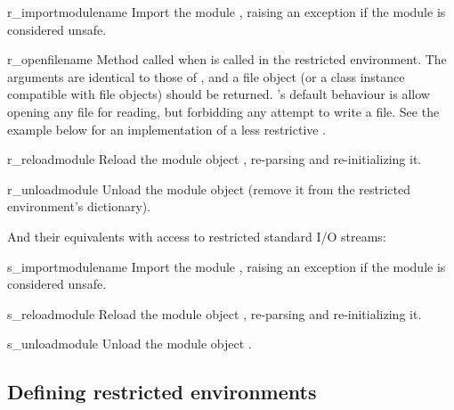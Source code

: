 \begin{methoddesc}{r_import}{modulename}
Import the module , raising an 
exception if the module is considered unsafe.
\end{methoddesc}

\begin{methoddesc}{r_open}{filename}
Method called when  is called in the restricted
environment.  The arguments are identical to those of ,
and a file object (or a class instance compatible with file objects)
should be returned.  's default behaviour is allow opening
any file for reading, but forbidding any attempt to write a file.  See
the example below for an implementation of a less restrictive
.
\end{methoddesc}

\begin{methoddesc}{r_reload}{module}
Reload the module object , re-parsing and re-initializing it.  
\end{methoddesc}

\begin{methoddesc}{r_unload}{module}
Unload the module object  (remove it from the
restricted environment's  dictionary).
\end{methoddesc}

And their equivalents with access to restricted standard I/O streams:

\begin{methoddesc}{s_import}{modulename}
Import the module , raising an 
exception if the module is considered unsafe.
\end{methoddesc}

\begin{methoddesc}{s_reload}{module}
Reload the module object , re-parsing and re-initializing it.  
\end{methoddesc}

\begin{methoddesc}{s_unload}{module}
Unload the module object .   
\end{methoddesc}


\subsection{Defining restricted environments \label{rexec-extension}}

